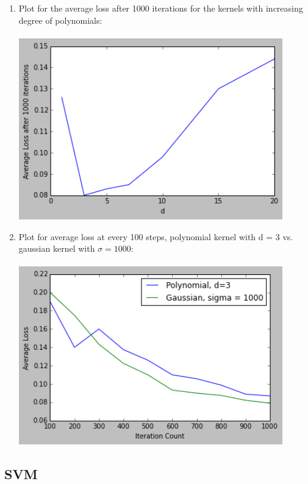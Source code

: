\documentclass[letterpaper]{article}
\begin{document}
\begin{enumerate}
\item Plot for the average loss after 1000 iterations for the kernels with increasing degree of polynomials:\\ \\ 
\includegraphics[width = 4.5in, keepaspectratio]{HW3_figure4.png}

\item Plot for average loss at every 100 steps, polynomial kernel with d = 3 vs. gaussian kernel with $\sigma = 1000$:\\  \\
\includegraphics[width = 4.5in, keepaspectratio]{HW3_figure5.png}

\end{enumerate}

\subsection{SVM}
\end{document}
